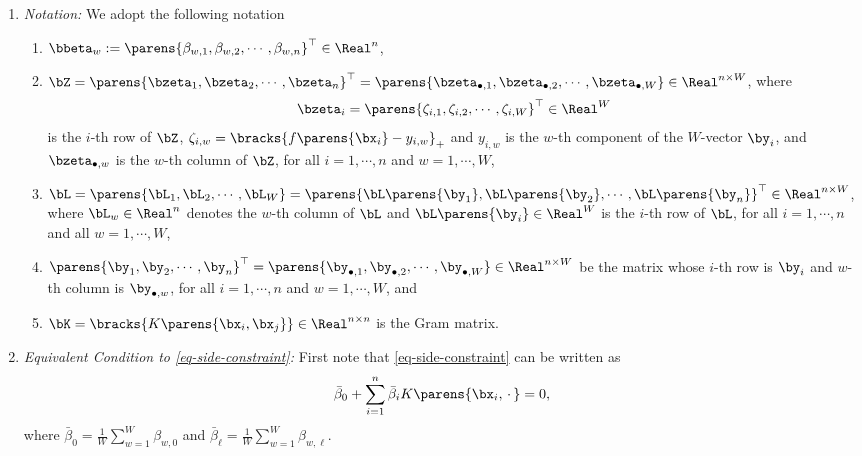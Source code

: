 \documentclass[12pt]{article}
\begin{document}
\begin{enumerate}[label=\textbf{\arabic*.}]
\begin{enumerate}
		\item \textit{Notation:} We adopt the following notation 
		\begin{enumerate}
			\item $\bbeta_{w} := \parens{\beta_{w, 1}, \beta_{w, 2}, \cdots, \beta_{w, n}}^\top \in \Real^n$, 
			\item $\bZ = \parens{\bzeta_1, \bzeta_2, \cdots, \bzeta_n}^\top = \parens{\bzeta_{\bullet, 1}, \bzeta_{\bullet, 2}, \cdots, \bzeta_{\bullet, W}} \in \Real^{n \times W}$, where 
			\begin{align*}
				\bzeta_i = \parens{\zeta_{i,1}, \zeta_{i,2}, \cdots, \zeta_{i,W}}^\top \in \Real^W
			\end{align*}
			is the $i$-th row of $\bZ$, $\zeta_{i, w} = \bracks{f \parens{\bx_i} - y_{i, w}}_+$ and $y_{i, w}$ is the $w$-th component of the $W$-vector $\by_i$, and $\bzeta_{\bullet, w}$ is the $w$-th column of $\bZ$, for all $i = 1, \cdots, n$ and $w = 1, \cdots, W$,  
			\item $\bL = \parens{\bL_1, \bL_2, \cdots, \bL_{W}} = \parens{\bL \parens{\by_1}, \bL \parens{\by_2}, \cdots, \bL \parens{\by_n}}^\top \in \Real^{n \times W}$, where $\bL_w \in \Real^n$ denotes the $w$-th column of $\bL$ and $\bL \parens{\by_i} \in \Real^W$ is the $i$-th row of $\bL$, for all $i = 1, \cdots, n$ and all $w = 1, \cdots, W$, 
			\item $\parens{\by_{1}, \by_2, \cdots, \by_n}^\top = \parens{\by_{\bullet, 1}, \by_{\bullet, 2}, \cdots, \by_{\bullet, W}} \in \Real^{n \times W}$ be the matrix whose $i$-th row is $\by_i$ and $w$-th column is $\by_{\bullet, w}$, for all $i = 1, \cdots, n$ and $w = 1, \cdots, W$, and 
			\item $\bK = \bracks{K \parens{\bx_i, \bx_j}} \in \Real^{n \times n}$ is the Gram matrix. 
		\end{enumerate}
		\item \textit{Equivalent Condition to \eqref{eq-side-constraint}:} First note that \eqref{eq-side-constraint} can be written as 
		\begin{align*}
			\bar{\beta}_0 + \sum_{i=1}^n \bar{\beta}_{i} K \parens{\bx_{i}, \,\cdot\,} = 0, 
		\end{align*}
		where $\bar{\beta}_0 = \frac{1}{W} \sum_{w=1}^W \beta_{w,0}$ and $\bar{\beta}_{\ell} = \frac{1}{W} \sum_{w=1}^W \beta_{w,\ell}$. 
		

\end{enumerate}
\end{enumerate}
\end{document}
